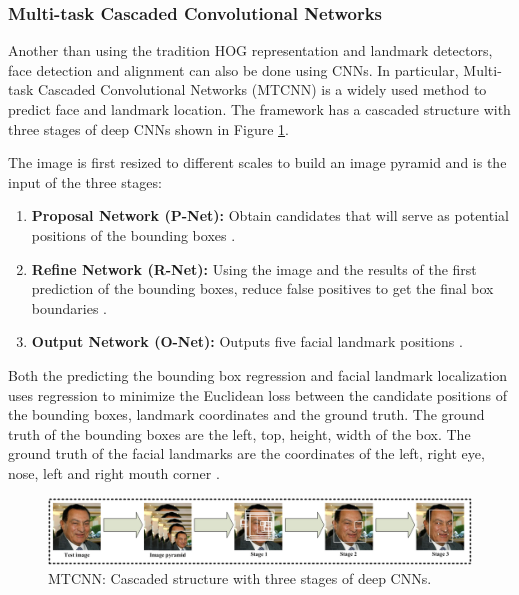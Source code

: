 \documentclass[12pt,english]{article}
\begin{document}
\subsubsection{Multi-task Cascaded Convolutional Networks}

Another than using the tradition HOG representation and landmark detectors, face detection and alignment can also be done using CNNs. In particular, Multi-task Cascaded Convolutional Networks (MTCNN) is a widely used method to predict face and landmark location. The framework has a cascaded structure with three stages of deep CNNs shown in Figure \ref{fig:mtcnn}. \cite{zhang} 

The image is first resized to different scales to build an image pyramid and is the input of the three stages:

\begin{enumerate}
\item \textbf{Proposal Network (P-Net):} Obtain candidates that will serve as potential positions of the bounding boxes \cite{chinapas}.

\item \textbf{Refine Network (R-Net):} Using the image and the results of the first prediction of the bounding boxes, reduce false positives to get the final box boundaries \cite{chinapas}.

\item \textbf{Output Network (O-Net):} Outputs five facial landmark positions \cite{zhang}.

\end{enumerate}

Both the predicting the bounding box regression and facial landmark localization uses regression to minimize the Euclidean loss between the candidate positions of the bounding boxes, landmark coordinates and the ground truth. The ground truth of the bounding boxes are the left, top, height, width of the box. The ground truth of the facial landmarks are the coordinates of the left, right eye, nose, left and right mouth corner \cite{zhang}.


\begin{figure}[!tbp]
 \centering
    \includegraphics[width=\columnwidth]{figures/mtcnn_pipeline2.png}
    \caption{MTCNN: Cascaded structure with three stages of deep CNNs. \cite{zhang}}
	\label{fig:mtcnn}
\end{figure}
\end{document}
